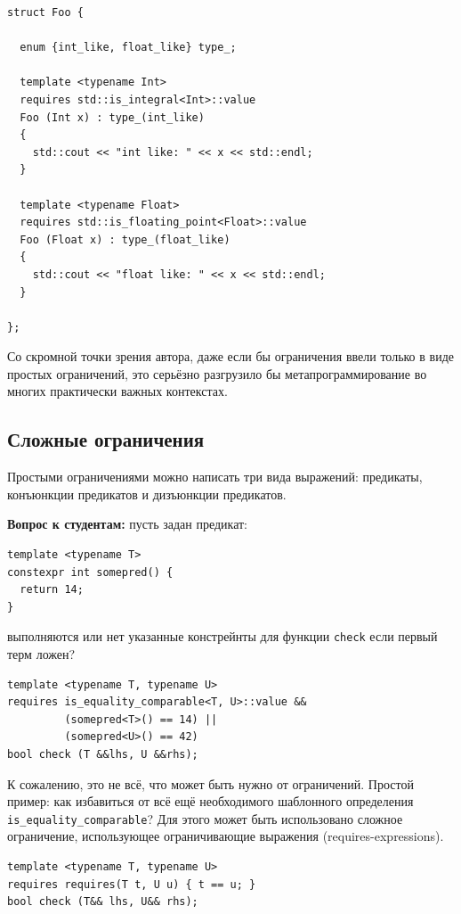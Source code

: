 \documentclass[a4paper,12pt,oneside]{book}
\newif\ifanswers
\begin{document}
\begin{lstlisting}
struct Foo {

  enum {int_like, float_like} type_;

  template <typename Int>
  requires std::is_integral<Int>::value
  Foo (Int x) : type_(int_like)
  {
    std::cout << "int like: " << x << std::endl;
  }

  template <typename Float>
  requires std::is_floating_point<Float>::value
  Foo (Float x) : type_(float_like)
  {
    std::cout << "float like: " << x << std::endl;
  }

};
\end{lstlisting}

Со скромной точки зрения автора, даже если бы ограничения ввели только в виде простых ограничений, это серьёзно разгрузило бы метапрограммирование во многих практически важных контекстах.

\subsection{Сложные ограничения}

Простыми ограничениями можно написать три вида выражений: предикаты, конъюнкции предикатов и дизъюнкции предикатов.

\textbf{Вопрос к студентам:} пусть задан предикат:

\begin{lstlisting}
template <typename T>
constexpr int somepred() {
  return 14;
}
\end{lstlisting}

выполняются или нет указанные констрейнты для функции \lstinline!check! если первый терм ложен?

\begin{lstlisting}
template <typename T, typename U>
requires is_equality_comparable<T, U>::value &&
         (somepred<T>() == 14) || 
         (somepred<U>() == 42)
bool check (T &&lhs, U &&rhs);
\end{lstlisting}

\ifanswers
Правильный ответ: конечно нет, так как \lstinline!false && true || false! по обычной схеме дает false
\fi

К сожалению, это не всё, что может быть нужно от ограничений. Простой пример: как избавиться от всё ещё необходимого шаблонного определения \lstinline!is_equality_comparable!? Для этого может быть использовано сложное ограничение, использующее ограничивающие выражения (requires-expressions).

\begin{lstlisting}
template <typename T, typename U>
requires requires(T t, U u) { t == u; }
bool check (T&& lhs, U&& rhs);
\end{lstlisting}
\end{document}

